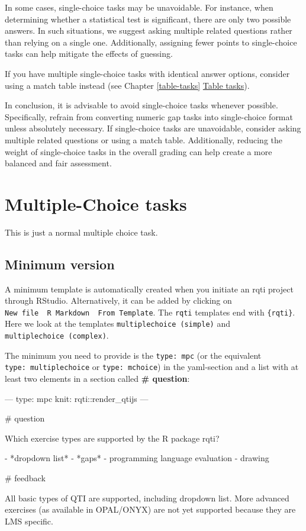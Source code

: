\documentclass[twoside]{tufte-book}
\newenvironment{Shaded}{}{}
\begin{document}
In some cases, single-choice tasks may be unavoidable. For instance, when determining whether a statistical test is significant, there are only two possible answers. In such situations, we suggest asking multiple related questions rather than relying on a single one. Additionally, assigning fewer points to single-choice tasks can help mitigate the effects of guessing.

If you have multiple single-choice tasks with identical answer options, consider using a match table instead (see Chapter \ref{table-tasks} \href{table.html}{Table tasks}).

In conclusion, it is advisable to avoid single-choice tasks whenever possible. Specifically, refrain from converting numeric gap tasks into single-choice format unless absolutely necessary. If single-choice tasks are unavoidable, consider asking multiple related questions or using a match table. Additionally, reducing the weight of single-choice tasks in the overall grading can help create a more balanced and fair assessment.

\chapter{Multiple-Choice tasks}\label{multiple-choice-tasks}

This is just a normal multiple choice task.

\section{Minimum version}\label{minimum-version-1}

A minimum template is automatically created when you initiate an rqti project through RStudio. Alternatively, it can be added by clicking on \texttt{New\ file\ \textrightarrow{}\ R\ Markdown\ \textrightarrow{}\ From\ Template}. The \texttt{rqti} templates end with \texttt{\{rqti\}}. Here we look at the templates \texttt{multiplechoice\ (simple)} and \texttt{multiplechoice\ (complex)}.

The minimum you need to provide is the \texttt{type:\ mpc} (or the equivalent \texttt{type:\ multiplechoice} or \texttt{type:\ mchoice}) in the yaml-section and a list with at least two elements in a section called \textbf{\# question}:

\begin{Shaded}
\begin{Highlighting}
---
type: mpc
knit: rqti::render_qtijs
---

# question

Which exercise types are supported by the R package rqti?

- *dropdown list*
- *gaps*
- programming language evaluation
- drawing

# feedback

All basic types of QTI are supported, including dropdown list. More advanced
exercises (as available in OPAL/ONYX) are not yet supported because they are LMS
specific.
\end{Highlighting}
\end{Shaded}
\end{document}
